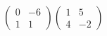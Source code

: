 \hspace*{2mm}\begin{minipage}[t]{\dimexpr\linewidth-2mm\relax}\vspace{0pt}
$\begin{pmatrix} 0 & -6 \\ 1 & 1 \end{pmatrix}\begin{pmatrix} 1 & 5 \\ 4 & -2 \end{pmatrix}$\end{minipage}
